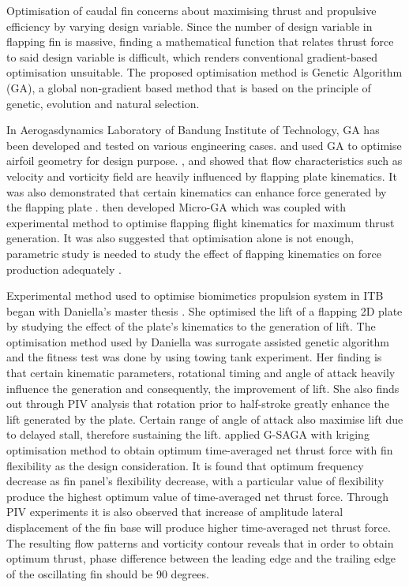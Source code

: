 Optimisation of caudal fin concerns about maximising thrust and propulsive efficiency by varying design variable. Since the number of design variable in flapping fin is massive, finding a mathematical function that relates thrust force to said design variable is difficult, which renders conventional gradient-based optimisation unsuitable. The proposed optimisation method is Genetic Algorithm (GA), a global non-gradient based method that is based on the  principle of genetic, evolution and natural selection.\par
In Aerogasdynamics Laboratory of Bandung Institute of Technology, GA has been developed and tested on various engineering cases. \citet{adhynugraha} and \citet{dwianto2} used GA to optimise airfoil geometry for design purpose. \citet{nguyen}, \citet{nguyen2} and \citet{wuwung} showed that flow characteristics such as velocity and vorticity field are heavily influenced by flapping plate kinematics. It was also demonstrated that certain kinematics can enhance force generated by the flapping plate \citep{nguyen}. \citet{palar} then developed Micro-GA which was coupled with experimental method to optimise flapping flight kinematics for maximum thrust generation. It was also suggested that optimisation alone is not enough, parametric study is needed to study the effect of flapping kinematics on force production adequately \citep{palar2}.\par
Experimental method used to optimise biomimetics propulsion system in ITB began with Daniella's master thesis \citep{dea}. She optimised the lift of a flapping 2D plate by studying the effect of the plate's kinematics to the generation of lift. The optimisation method used by Daniella was surrogate assisted genetic algorithm and the fitness test was done by using towing tank experiment. Her finding is that certain kinematic parameters, rotational timing and angle of attack heavily influence the generation and consequently, the improvement of lift. She also finds out through PIV analysis that rotation prior to half-stroke greatly enhance the lift generated by the plate. Certain range of angle of attack also maximise lift due to delayed stall, therefore sustaining the lift. \citet{luqman} applied G-SAGA with kriging optimisation method to obtain optimum time-averaged net thrust force with fin flexibility as the design consideration. It is found that optimum frequency decrease as fin panel's flexibility decrease, with a particular value of flexibility produce the highest optimum value of time-averaged net thrust force. Through PIV experiments it is also observed that increase of amplitude lateral displacement of the fin base will produce higher time-averaged net thrust force. The resulting flow patterns and vorticity contour reveals that in order to obtain optimum thrust, phase difference between the leading edge and the trailing edge of the oscillating fin should be 90 degrees.\par
